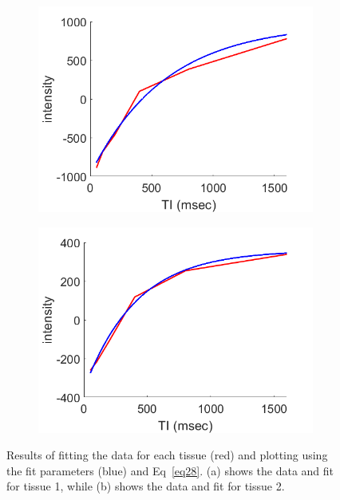 \documentclass[12pt]{article}
\begin{document}
\begin{figure}[H]
	\begin{subfigure}{.5\textwidth}
		\centering
		\includegraphics[width=.95\linewidth]{tissue1_fit.png}
		\caption{}
		\label{fig:t1fit}
	\end{subfigure}%
	\begin{subfigure}{.5\textwidth}
		\centering
		\includegraphics[width=.95\linewidth]{tissue2_fit.png}
		\caption{}
		\label{fig:t2fit}
	\end{subfigure}
	\caption{Results of fitting the data for each tissue (red) and plotting using the fit parameters (blue) and Eq~\ref{eq28}. (a) shows the data and fit for tissue 1, while (b) shows the data and fit for tissue 2.}
	\label{fig:tissuefits}
\end{figure}
\end{document}
